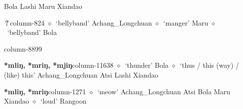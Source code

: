 \hspace{1ex}
         Bola 
\hspace{1ex}
         Lashi 
\hspace{1ex}
         Maru 
\hspace{1ex}
         Xiandao 
  \item {\footnotesize \textbf{\,?\,}}{\tiny column-824}
         $\diamond$~`bellyband'
         Achang\_Longchuan 
\hspace{1ex}
         $\diamond$~`manger'
         Maru 
\hspace{1ex}
         $\diamond$~`bellyband'
         Bola 
  \item {\footnotesize \textbf{}}{\tiny column-8899}
  \item {\footnotesize \textbf{*mliŋ, *mriŋ, *mjiŋ}}{\tiny column-11638}
         $\diamond$~`thunder'
         Bola 
\hspace{1ex}
         $\diamond$~`thus / this (way) / (like) this'
         Achang\_Longchuan 
\hspace{1ex}
         Atsi 
\hspace{1ex}
         Lashi 
\hspace{1ex}
         Xiandao 
  \item {\footnotesize \textbf{*mliŋ, *mriŋ}}{\tiny column-1271}
         $\diamond$~`meow'
         Achang\_Longchuan 
\hspace{1ex}
         Atsi 
\hspace{1ex}
         Bola 
\hspace{1ex}
         Maru 
\hspace{1ex}
         Xiandao 
\hspace{1ex}
         $\diamond$~`loud'
         Rangoon 
\hspace{1ex}
